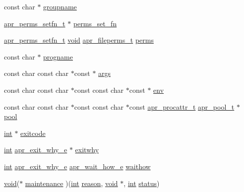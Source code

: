 \begin{DoxyCompactItemize}
\item 
const char $\ast$ \hyperlink{group__apr__thread__proc_ga401185bb13a6f4bfeccd15a40ff2efcd}{groupname}
\item 
\hyperlink{group__apr__perms__set_ga65b3990e3ff0b2e9e3c3ebe417c464be}{apr\+\_\+perms\+\_\+setfn\+\_\+t} $\ast$ \hyperlink{group__apr__thread__proc_ga1e3efe551f1dbe717b1a6b65ec6fce3a}{perms\+\_\+set\+\_\+fn}
\item 
\hyperlink{group__apr__perms__set_ga65b3990e3ff0b2e9e3c3ebe417c464be}{apr\+\_\+perms\+\_\+setfn\+\_\+t} \hyperlink{group__MOD__ISAPI_gacd6cdbf73df3d9eed42fa493d9b621a6}{void} \hyperlink{group__apr__file__info_ga3af19c4c47007169064a70f9351bc7d8}{apr\+\_\+fileperms\+\_\+t} \hyperlink{group__apr__thread__proc_gafc71bc1bf704fcad86b6ac2f8d916b4f}{perms}
\item 
const char $\ast$ \hyperlink{group__apr__thread__proc_gad785d8a8f8ff378aa21eb1fa7a6085df}{progname}
\item 
const char const char $\ast$const $\ast$ \hyperlink{group__apr__thread__proc_gab185e694a4eb4f843f733eaf264ab357}{args}
\item 
const char const char $\ast$const const char $\ast$const $\ast$ \hyperlink{group__apr__thread__proc_gaf265d8eb81b589ed808213bd43656deb}{env}
\item 
const char const char $\ast$const const char $\ast$const \hyperlink{structapr__procattr__t}{apr\+\_\+procattr\+\_\+t} \hyperlink{structapr__pool__t}{apr\+\_\+pool\+\_\+t} $\ast$ \hyperlink{group__apr__thread__proc_ga4d4955f2f41366cd4bc1761c8cbcff76}{pool}
\item 
\hyperlink{pcre_8txt_a42dfa4ff673c82d8efe7144098fbc198}{int} $\ast$ \hyperlink{group__apr__thread__proc_gaeba35c0118bd9b7c5258ba8ccdd27174}{exitcode}
\item 
\hyperlink{pcre_8txt_a42dfa4ff673c82d8efe7144098fbc198}{int} \hyperlink{group__apr__thread__proc_gac097b4fa41e67024711c5983446d0951}{apr\+\_\+exit\+\_\+why\+\_\+e} $\ast$ \hyperlink{group__apr__thread__proc_ga723f20a59b9332ca01bcb7ab30da2457}{exitwhy}
\item 
\hyperlink{pcre_8txt_a42dfa4ff673c82d8efe7144098fbc198}{int} \hyperlink{group__apr__thread__proc_gac097b4fa41e67024711c5983446d0951}{apr\+\_\+exit\+\_\+why\+\_\+e} \hyperlink{group__apr__thread__proc_ga5e52d786644f3b66d6180571e68c7260}{apr\+\_\+wait\+\_\+how\+\_\+e} \hyperlink{group__apr__thread__proc_gac365b1947e539c071abab05c84b9ff0f}{waithow}
\item 
\hyperlink{group__MOD__ISAPI_gacd6cdbf73df3d9eed42fa493d9b621a6}{void}($\ast$ \hyperlink{group__apr__thread__proc_gadfff1d91551888e1d2fb62ffac465704}{maintenance} )(\hyperlink{pcre_8txt_a42dfa4ff673c82d8efe7144098fbc198}{int} \hyperlink{perltest_8txt_accc58ff66e0025e508b912673edd4099}{reason}, \hyperlink{group__MOD__ISAPI_gacd6cdbf73df3d9eed42fa493d9b621a6}{void} $\ast$, \hyperlink{pcre_8txt_a42dfa4ff673c82d8efe7144098fbc198}{int} \hyperlink{group__apr__thread__proc_gae7daf19056dc6ab36e8f2e72e911646d}{status})

\end{DoxyCompactItemize}
